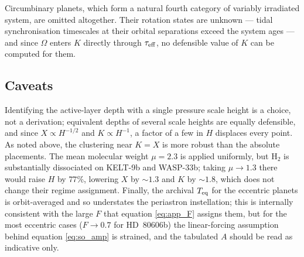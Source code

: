 \documentclass[trackchanges,twocolumn]{aastex7}
\begin{document}
Circumbinary planets, which form a natural fourth category of variably irradiated system, are omitted altogether. Their rotation states are unknown --- tidal synchronisation timescales at their orbital separations exceed the system ages --- and since $\Omega$ enters $K$ directly through $\tau_{\rm eff}$, no defensible value of $K$ can be computed for them.

\subsection{Caveats}

Identifying the active-layer depth with a single pressure scale height is a choice, not a derivation; equivalent depths of several scale heights are equally defensible, and since $X \propto H^{-1/2}$ and $K \propto H^{-1}$, a factor of a few in $H$ displaces every point. As noted above, the clustering near $K = X$ is more robust than the absolute placements. The mean molecular weight $\mu = 2.3$ is applied uniformly, but H$_2$ is substantially dissociated on KELT-9b and WASP-33b; taking $\mu \to 1.3$ there would raise $H$ by $77\%$, lowering $X$ by ${\sim}1.3$ and $K$ by ${\sim}1.8$, which does not change their regime assignment. Finally, the archival $T_{\rm eq}$ for the eccentric planets is orbit-averaged and so understates the periastron instellation; this is internally consistent with the large $F$ that equation \eqref{eq:app_F} assigns them, but for the most eccentric cases ($F \to 0.7$ for HD~80606b) the linear-forcing assumption behind equation \eqref{eq:so_amp} is strained, and the tabulated $A$ should be read as indicative only.
\end{document}
